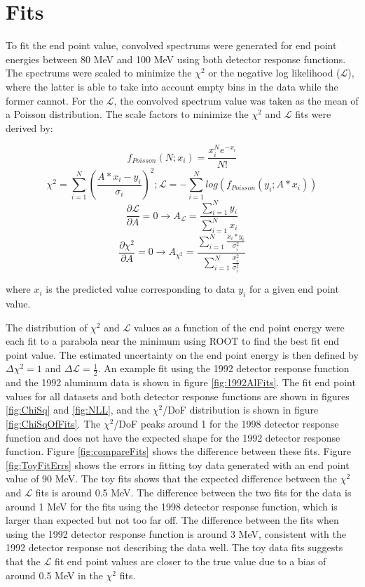 
\section { Fits }

To fit the end point value, convolved spectrums were generated for end point energies
between 80 MeV and 100 MeV using both detector response functions. The spectrums were scaled to minimize the $\chi^2$
or the negative log likelihood ($\mathcal{L}$), where the latter is able to take into account empty
bins in the data while the former cannot. For the $\mathcal{L}$, the convolved spectrum value was taken as the mean of
a Poisson distribution. The scale factors to minimize the $\chi^2$ and $\mathcal{L}$ fits were derived by:

$$f_{Poisson}(N;x_i) = \frac{x_i^N e^{-x_i}}{N!}$$
$$\chi^2 = \sum^N_{i=1} (\frac{A*x_i - y_i}{\sigma_i})^2; \mathcal{L} = -\sum^N_{i=1}log(f_{Poisson}(y_i;A*x_i))$$
$$\frac{\partial \mathcal{L}}{\partial A} = 0 \rightarrow A_{\mathcal{L}} = \frac{\sum^N_{i=1} y_i}{\sum^N_{i=1} x_i} $$
$$\frac{\partial \chi^2}{\partial A} = 0 \rightarrow A_{\chi^2} = \frac{\sum^N_{i=1} \frac{x_i*y_i}{\sigma_i^2}}{\sum^N_{i=1} \frac{x_i^2}{\sigma_i^2}} $$

\noindent
where $x_i$ is the predicted value corresponding to data $y_i$ for a given end point value.

The distribution of $\chi^2$ and $\mathcal{L}$ values as a function of the end point energy were each fit to a parabola near 
the minimum using ROOT to find the best fit end point value. The estimated uncertainty on the end point energy is then
defined by $\Delta \chi^2 = 1$ and $\Delta \mathcal{L} = \frac{1}{2}$. An example fit using the 1992 detector response function
and the 1992 aluminum data is shown in figure \ref{fig:1992AlFits}. The fit end point values for all 
datasets and both detector response functions are shown in figures \ref{fig:ChiSq} and \ref{fig:NLL}, and the $\chi^2$/DoF
distribution is shown in figure \ref{fig:ChiSqOfFits}. The $\chi^2$/DoF peaks around 1 for the 1998 detector response 
function and does not have the expected shape for the 1992 detector response function. Figure \ref{fig:compareFits}
shows the difference between these fits. Figure \ref{fig:ToyFitErrs} shows the errors in fitting toy data generated with
an end point value of 90 MeV. The toy fits shows that the expected difference between the $\chi^2$ and $\mathcal{L}$ fits is around 0.5 MeV.
The difference between the two fits for the data is around 1 MeV for the fits using the 1998 detector response function,
which is larger than expected but not too far off. The difference between the fits when using the 1992 detector response function
is around 3 MeV, consistent with the 1992 detector response not describing the data well.
The toy data fits suggests that the $\mathcal{L}$ fit end point values are closer to the true value due to a bias of around 0.5 MeV 
in the $\chi^2$ fits.

